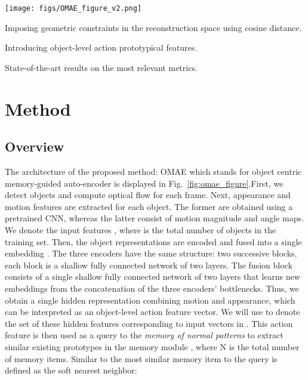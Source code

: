 \documentclass{article}
\begin{document}
\begin{figure*}
	\centering
	\texttt{[image: figs/OMAE\_figure\_v2.png]}
	\caption{ Overview of OMAE. At the preprocessing step, object bounding boxes and Optical Flow (OF) are computed. Object appearance features, extracted using a pretrained CNN, motion magnitude and angle maps are fed to the corresponding autoencoders. The encoded representations are fused () and sent as a query to the memory module which fetches similar memory items. Their linear combination concatenated with  is sent to the decoder to obtain object appearance and motion reconstructions. The anomaly score is defined based on the dissimilarity between the input features and their reconstructions as well the dissimilarity between the query  and its neighbors.}
	\label{fig:omae_figure}
\end{figure*}

  Imposing geometric constraints in the reconstruction space using cosine distance.
 
  Introducing object-level action prototypical features.

   State-of-the-art results on the most relevant metrics.

\section{Method}
\label{sec:method}
\subsection{Overview}

The architecture of the proposed method: OMAE which stands for object centric memory-guided auto-encoder is displayed in Fig.~\ref{fig:omae_figure}.First, we detect objects and compute optical flow for each frame. Next, appearance  and motion  features are extracted for each object. The former are obtained using a pretrained CNN, whereas the latter consist of motion magnitude and angle maps. We denote the input features  \; ,  where  is the total number of objects in the training set. Then, the object representations are encoded and fused into a single embedding .
The three encoders have the same structure: two successive blocks, each block is a shallow fully connected network of two layers. The fusion block consists of a single shallow fully connected network of two layers that learns new embeddings from the concatenation of the three encoders' bottlenecks. 
Thus, we obtain a single hidden representation combining motion and appearance, which can be interpreted as an object-level action feature vector. We will use  to denote the set of these hidden features corresponding to input vectors in . This action feature is then used as a query to the \emph{memory of normal patterns} to extract similar existing prototypes in the memory module ,  where N is the total number of memory items. 
Similar to \cite{mnad} the most similar memory item  to the query  is defined as the soft nearest neighbor:
\end{document}
